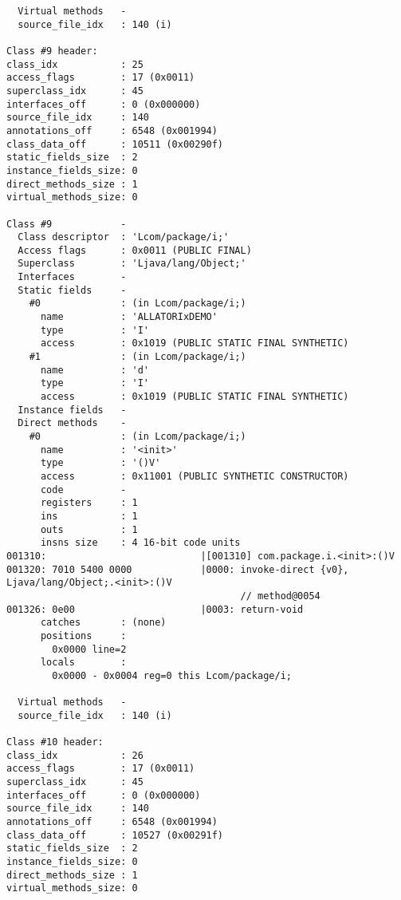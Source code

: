 \begin{lstlisting}
  Virtual methods   -
  source_file_idx   : 140 (i)

Class #9 header:
class_idx           : 25
access_flags        : 17 (0x0011)
superclass_idx      : 45
interfaces_off      : 0 (0x000000)
source_file_idx     : 140
annotations_off     : 6548 (0x001994)
class_data_off      : 10511 (0x00290f)
static_fields_size  : 2
instance_fields_size: 0
direct_methods_size : 1
virtual_methods_size: 0

Class #9            -
  Class descriptor  : 'Lcom/package/i;'
  Access flags      : 0x0011 (PUBLIC FINAL)
  Superclass        : 'Ljava/lang/Object;'
  Interfaces        -
  Static fields     -
    #0              : (in Lcom/package/i;)
      name          : 'ALLATORIxDEMO'
      type          : 'I'
      access        : 0x1019 (PUBLIC STATIC FINAL SYNTHETIC)
    #1              : (in Lcom/package/i;)
      name          : 'd'
      type          : 'I'
      access        : 0x1019 (PUBLIC STATIC FINAL SYNTHETIC)
  Instance fields   -
  Direct methods    -
    #0              : (in Lcom/package/i;)
      name          : '<init>'
      type          : '()V'
      access        : 0x11001 (PUBLIC SYNTHETIC CONSTRUCTOR)
      code          -
      registers     : 1
      ins           : 1
      outs          : 1
      insns size    : 4 16-bit code units
001310:                           |[001310] com.package.i.<init>:()V
001320: 7010 5400 0000            |0000: invoke-direct {v0}, Ljava/lang/Object;.<init>:()V
                                         // method@0054
001326: 0e00                      |0003: return-void
      catches       : (none)
      positions     :
        0x0000 line=2
      locals        :
        0x0000 - 0x0004 reg=0 this Lcom/package/i;

  Virtual methods   -
  source_file_idx   : 140 (i)

Class #10 header:
class_idx           : 26
access_flags        : 17 (0x0011)
superclass_idx      : 45
interfaces_off      : 0 (0x000000)
source_file_idx     : 140
annotations_off     : 6548 (0x001994)
class_data_off      : 10527 (0x00291f)
static_fields_size  : 2
instance_fields_size: 0
direct_methods_size : 1
virtual_methods_size: 0


\end{lstlisting}
